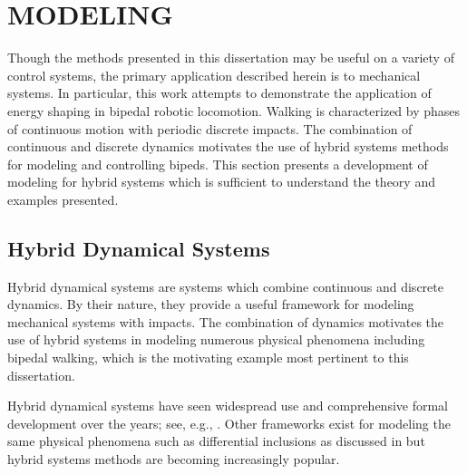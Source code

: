 \chapter{\uppercase{Modeling}} \label{ch:modeling}

Though the methods presented in this dissertation may be useful on a variety of
control systems, the primary application described herein is to mechanical
systems.
%
In particular, this work attempts to demonstrate the application of energy
shaping in bipedal robotic locomotion.
%
Walking is characterized by phases of continuous motion with periodic discrete
impacts.
%
The combination of continuous and discrete dynamics motivates the use of hybrid
systems methods for modeling and controlling bipeds.
%
This section presents a development of modeling for hybrid systems which is
sufficient to understand the theory and examples presented.


\section{Hybrid Dynamical Systems}

Hybrid dynamical systems are systems which combine continuous and discrete
dynamics.
%
By their nature, they provide a useful framework for modeling mechanical systems
with impacts.
%
The combination of dynamics motivates the use of hybrid systems in modeling
numerous physical phenomena including bipedal walking, which is the motivating
example most pertinent to this dissertation.
%

Hybrid dynamical systems have seen widespread use and comprehensive formal
development over the years;
%
see, e.g., \cite{Branicky1998, Goebel2009, Grizzle2014, Schaft2000,
  Westervelt2007}.
%
Other frameworks exist for modeling the same physical phenomena such as
differential inclusions as discussed in \cite{Filippov1988} but hybrid systems
methods are becoming increasingly popular.

